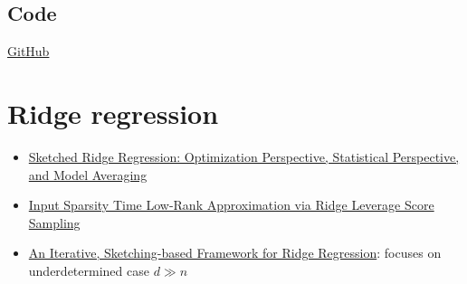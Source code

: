 \documentclass[10pt]{article}
\begin{document}
\subsection{Code}

\href{https://github.com/jonathanlctt/ihs_srht}{GitHub}



\newpage



\section{Ridge regression}

\begin{itemize}
\item
\href{https://www.jmlr.org/papers/volume18/17-313/17-313.pdf}{Sketched Ridge Regression: Optimization Perspective, Statistical Perspective, and Model Averaging}
\item
\href{https://arxiv.org/pdf/1511.07263.pdf}{Input Sparsity Time Low-Rank Approximation via Ridge Leverage Score Sampling}
\item
\href{https://proceedings.mlr.press/v80/chowdhury18a/chowdhury18a.pdf}{An Iterative, Sketching-based Framework for Ridge Regression}: focuses on underdetermined case $d\gg n$
\end{itemize}
\end{document}
